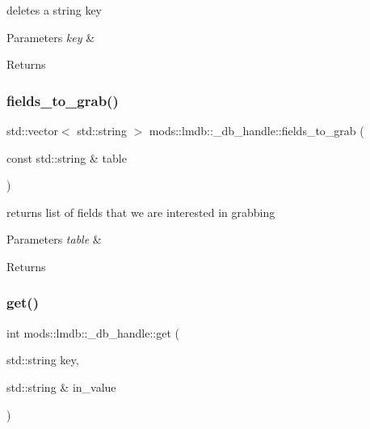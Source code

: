deletes a string key 


\begin{DoxyParams}{Parameters}
{\em key} & \\
\hline
\end{DoxyParams}
\begin{DoxyReturn}{Returns}

\end{DoxyReturn}
\mbox{\label{structmods_1_1lmdb_1_1__db__handle_a131a1099a47fc324190bacaeb984cd33}} 
\subsubsection{\texorpdfstring{fields\+\_\+to\+\_\+grab()}{fields\_to\_grab()}}
{\footnotesize\ttfamily std\+::vector$<$ std\+::string $>$ mods\+::lmdb\+::\+\_\+db\+\_\+handle\+::fields\+\_\+to\+\_\+grab (\begin{DoxyParamCaption}\item[{const std\+::string \&}]{table }\end{DoxyParamCaption})}



returns list of fields that we are interested in grabbing 


\begin{DoxyParams}{Parameters}
{\em table} & \\
\hline
\end{DoxyParams}
\begin{DoxyReturn}{Returns}

\end{DoxyReturn}
\mbox{\label{structmods_1_1lmdb_1_1__db__handle_a7087d7d0a9cf7476492f89baedd97a36}} 
\subsubsection{\texorpdfstring{get()}{get()}\hspace{0.1cm}{\footnotesize\ttfamily [1/2]}}
{\footnotesize\ttfamily int mods\+::lmdb\+::\+\_\+db\+\_\+handle\+::get (\begin{DoxyParamCaption}\item[{std\+::string}]{key,  }\item[{std\+::string \&}]{in\+\_\+value }\end{DoxyParamCaption})}



